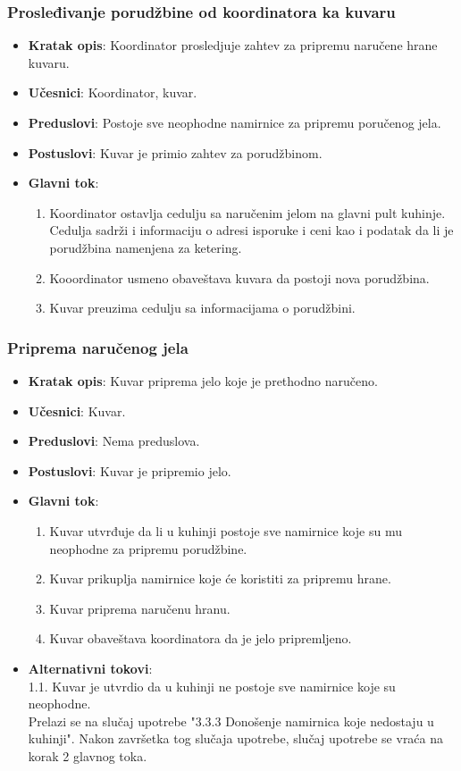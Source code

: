 \subsubsection{Prosleđivanje porudžbine od koordinatora ka kuvaru}
\begin{itemize}
    \item \textbf{Kratak opis}:
    Koordinator prosledjuje zahtev za pripremu naručene hrane kuvaru.
    \item \textbf{Učesnici}:
    Koordinator, kuvar.
    \item \textbf{Preduslovi}:
    Postoje sve neophodne namirnice za pripremu poručenog jela.
    \item \textbf{Postuslovi}:
    Kuvar je primio zahtev za porudžbinom.
    \item \textbf{Glavni tok}:
   \begin{enumerate}
        \item Koordinator ostavlja cedulju sa naručenim jelom na glavni pult kuhinje. Cedulja sadrži i informaciju o adresi isporuke i ceni kao i podatak da li je porudžbina namenjena za ketering.
        \item Kooordinator usmeno obaveštava kuvara da postoji nova porudžbina.
        \item Kuvar preuzima cedulju sa informacijama o porudžbini.
\end{enumerate}
\end{itemize}

\subsubsection{Priprema naručenog jela}
\begin{itemize}
    \item \textbf{Kratak opis}:
    Kuvar priprema jelo koje je prethodno naručeno.
    \item \textbf{Učesnici}:
    Kuvar.
    \item \textbf{Preduslovi}:
    Nema preduslova.
    \item \textbf{Postuslovi}:
    Kuvar je pripremio jelo.
    \item \textbf{Glavni tok}:
   \begin{enumerate}
        \item Kuvar utvrđuje da li u kuhinji postoje sve namirnice koje
        su mu neophodne za pripremu porudžbine.
        \item Kuvar prikuplja namirnice koje će koristiti za pripremu hrane.
        \item Kuvar priprema naručenu hranu.
        \item Kuvar obaveštava koordinatora da je
        jelo pripremljeno.
\end{enumerate}
 \item \textbf{Alternativni tokovi}:\\
     1.1. Kuvar je utvrdio da u kuhinji ne postoje
     sve namirnice koje su neophodne.
     \\ Prelazi se na slučaj
    upotrebe "3.3.3 Donošenje namirnica koje nedostaju u kuhinji". Nakon završetka tog slučaja upotrebe, slučaj upotrebe se
    vraća na korak 2 glavnog toka. 
\end{itemize}

